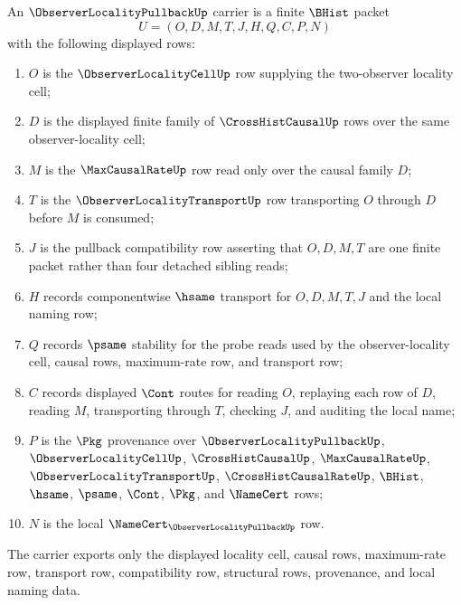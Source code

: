\begin{definition}
\label{def:observer-locality-pullback-carrier}
An $\ObserverLocalityPullbackUp$ carrier is a finite $\BHist$ packet
$$
U=(O,D,M,T,J,H,Q,C,P,N)
$$
with the following displayed rows:
\begin{enumerate}
\item $O$ is the $\ObserverLocalityCellUp$ row supplying the two-observer locality cell;
\item $D$ is the displayed finite family of $\CrossHistCausalUp$ rows over the same observer-locality cell;
\item $M$ is the $\MaxCausalRateUp$ row read only over the causal family $D$;
\item $T$ is the $\ObserverLocalityTransportUp$ row transporting $O$ through $D$ before $M$ is consumed;
\item $J$ is the pullback compatibility row asserting that $O,D,M,T$ are one finite packet rather than four detached sibling reads;
\item $H$ records componentwise $\hsame$ transport for $O,D,M,T,J$ and the local naming row;
\item $Q$ records $\psame$ stability for the probe reads used by the observer-locality cell, causal rows, maximum-rate row, and transport row;
\item $C$ records displayed $\Cont$ routes for reading $O$, replaying each row of $D$, reading $M$, transporting through $T$, checking $J$, and auditing the local name;
\item $P$ is the $\Pkg$ provenance over $\ObserverLocalityPullbackUp$, $\ObserverLocalityCellUp$, $\CrossHistCausalUp$, $\MaxCausalRateUp$, $\ObserverLocalityTransportUp$, $\CrossHistCausalRateUp$, $\BHist$, $\hsame$, $\psame$, $\Cont$, $\Pkg$, and $\NameCert$ rows;
\item $N$ is the local $\NameCert_{\ObserverLocalityPullbackUp}$ row.
\end{enumerate}
The carrier exports only the displayed locality cell, causal rows, maximum-rate row, transport row, compatibility row, structural rows, provenance, and local naming data.
\end{definition}

